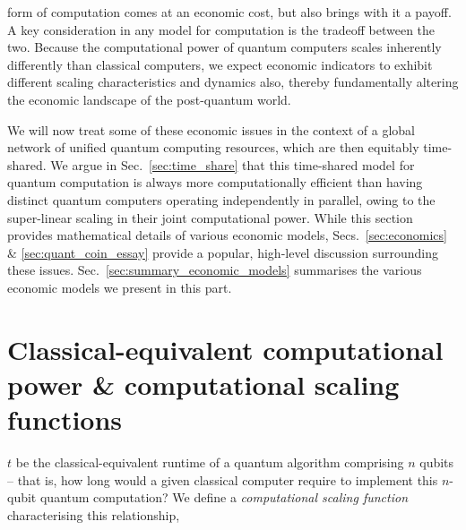 %
%

\newline

\newline

 form of computation comes at an economic cost, but also brings with it a payoff. A key consideration in any model for computation is the tradeoff between the two. Because the computational power of quantum computers scales inherently differently than classical computers, we expect economic indicators to exhibit different scaling characteristics and dynamics also, thereby fundamentally altering the economic landscape of the post-quantum world.

We will now treat some of these economic issues in the context of a global network of unified quantum computing resources, which are then equitably time-shared. We argue in Sec.~\ref{sec:time_share} that this time-shared model for quantum computation is always more computationally efficient than having distinct quantum computers operating independently in parallel, owing to the super-linear scaling in their joint computational power. While this section provides mathematical details of various economic models, Secs.~\ref{sec:economics} \& \ref{sec:quant_coin_essay} provide a popular, high-level discussion surrounding these issues. Sec.~\ref{sec:summary_economic_models} summarises the various economic models we present in this part.

%
%

\section{Classical-equivalent computational power \& computational scaling functions}\label{sec:comp_sc_func}

 $t$ be the classical-equivalent runtime of a quantum algorithm comprising $n$ qubits -- that is, how long would a given classical computer require to implement this $n$-qubit quantum computation? We define a \textit{computational scaling function} characterising this relationship,

